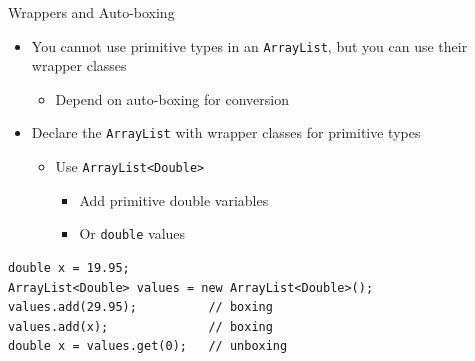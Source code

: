 \documentclass[aspectratio=43,10pt,t]{beamer}
\newcommand{\code}[1]{\texttt{#1}}
\begin{document}
\begin{frame}[fragile]{Wrappers and Auto-boxing}
  \begin{itemize}
    \item You cannot use primitive types in an \code{ArrayList}, but you can use their wrapper classes
      \begin{itemize}
        \item Depend on auto-boxing for conversion
      \end{itemize}
    \item Declare the \code{ArrayList} with wrapper classes for primitive types
      \begin{itemize}
        \item Use \code{ArrayList<Double>}
          \begin{itemize}
            \item Add primitive double variables
            \item Or \code{double} values
          \end{itemize}
      \end{itemize}
  \end{itemize}
\begin{lstlisting}[linewidth=0.82\linewidth,xleftmargin=0.12\linewidth]
double x = 19.95;
ArrayList<Double> values = new ArrayList<Double>();
values.add(29.95);          // boxing
values.add(x);              // boxing
double x = values.get(0);   // unboxing
\end{lstlisting}
\end{frame}
\end{document}
